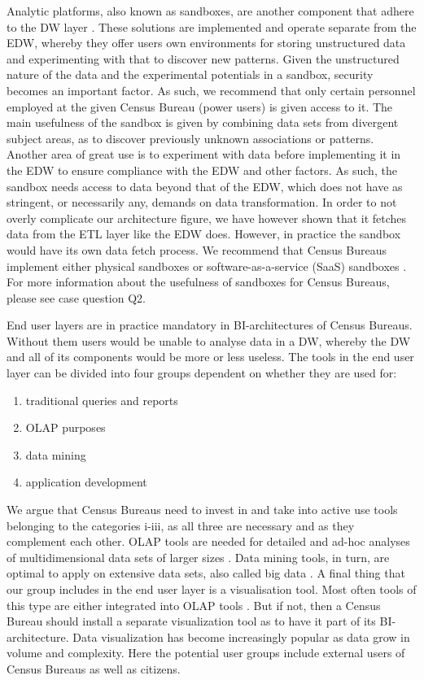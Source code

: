 Analytic platforms, also known as sandboxes, 
are another component that adhere to the DW layer \cite{l2video}. 
These solutions are implemented and operate separate from the EDW, 
whereby they offer users own environments for storing unstructured data and 
experimenting with that to discover new patterns. 
Given the unstructured nature of the data and the experimental potentials in a sandbox, 
security becomes an important factor. 
As such, we recommend that only certain personnel employed at the given Census Bureau (power users) 
is given access to it.  
The main usefulness of the sandbox is given by combining data sets from divergent subject areas, 
as to discover previously unknown associations or patterns. 
Another area of great use is to experiment with data before implementing it in the EDW 
to ensure compliance with the EDW and other factors. 
As such, the sandbox needs access to data beyond that of the EDW, 
which does not have as stringent, or necessarily any, demands on data transformation. 
In order to not overly complicate our architecture figure, 
we have however shown that it fetches data from the ETL layer like the EDW does. 
However, in practice the sandbox would have its own data fetch process. 
We recommend that Census Bureaus implement either physical sandboxes or 
software-as-a-service (SaaS) sandboxes \cite{l2video}. 
For more information about the usefulness of sandboxes for Census Bureaus, please see case question Q2.  

 

End user layers are in practice mandatory in BI-architectures of Census Bureaus. 
Without them users would be unable to analyse data in a DW, 
whereby the DW and all of its components would be more or less useless. 
The tools in the end user layer can be divided into four groups dependent on whether they are used for:\cite[chapter~31.2.10]{CourseLitt}
\begin{enumerate}[label=\roman*)]
  \item traditional queries and reports
  \item OLAP purposes
  \item data mining
  \item application development
\end{enumerate}

We argue that Census Bureaus need to invest in and take into active use tools belonging to the categories i-iii, 
as all three are necessary and as they complement each other. 
OLAP tools are needed for detailed and ad-hoc analyses of 
multidimensional data sets of larger sizes \cite[chapter~33.1]{CourseLitt}. 
Data mining tools, in turn, are optimal to apply on extensive data sets, 
also called big data \cite[chapter~34.1]{CourseLitt}.  
A final thing that our group includes in the end user layer is a visualisation tool. 
Most often tools of this type are either integrated into OLAP tools \cite{l4video}. 
But if not, then a Census Bureau should install a separate visualization tool as to 
have it part of its BI-architecture. 
Data visualization has become increasingly popular as data grow in volume and complexity. 
Here the potential user groups include external users of Census Bureaus as well as citizens.  